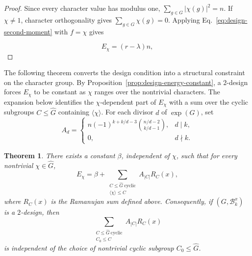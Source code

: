 \documentclass[11pt]{article}
\newtheorem{theorem}{Theorem}[section]
\theoremstyle{definition}
\newcommand{\C}{\mathbb C}
\newcommand{\cB}{\mathcal B}
\begin{document}
\begin{proof}
	Since every character value has modulus one,
	$\sum_{g\in G}|\chi(g)|^2=n$. If $\chi\ne1$, character
	orthogonality gives $\sum_{g\in G}\chi(g)=0$. Applying
	Eq.~\eqref{eq:design-second-moment} with $f=\chi$ gives
	
	$$
	E_\chi=(r-\lambda)n,
	$$
	

\end{proof}


The following theorem converts the design condition into a structural constraint on the character group. By Proposition~\ref{prop:design-energy-constant}, a $2$-design forces $E_\chi$ to be constant as $\chi$ ranges over the nontrivial characters. The expansion below identifies the $\chi$-dependent part of $E_\chi$ with a sum over the cyclic subgroups $C\le\widehat G$ containing $\langle\chi\rangle$. For each divisor $d$ of $\exp(G)$, set
\begin{equation}\label{eq:Ad-definition}
A_d=
\begin{cases}
n(-1)^{k+k/d-3}
\displaystyle\binom{n/d-2}{k/d-1},
& d\mid k,\\[2mm]
0, & d\nmid k.
\end{cases}
\end{equation}

\begin{theorem}\label{thm:energy-expansion}
	There exists a constant \(\beta\), independent of \(\chi\), such that for every nontrivial \(\chi\in\widehat G\),
	\begin{equation}
	E_\chi
	=
	\beta+
	\sum_{\substack{C\le\widehat G\ \mathrm{cyclic}\\
		\langle\chi\rangle\le C}}
	A_{|C|}R_C(x),
	\end{equation}
	where $R_C(x)$ is the Ramanujan sum defined above. Consequently, if $(G,\cB_k^x)$ is a $2$-design, then
	\begin{equation}\label{eq:energy-system}
	\sum_{\substack{C\le\widehat G\ \mathrm{cyclic}\\C_0\le C}}A_{|C|}R_C(x)
	\end{equation}
	is independent of the choice of nontrivial cyclic subgroup $C_0\le\widehat G$.
\end{theorem}
\end{document}
